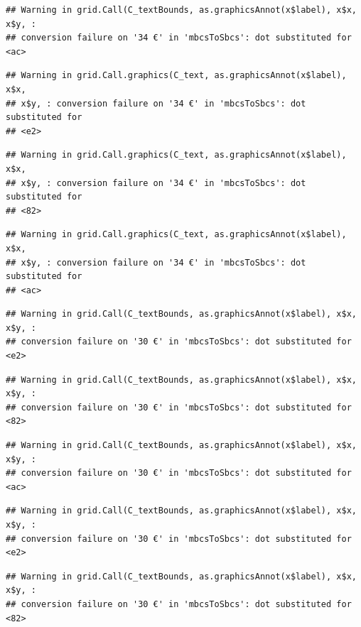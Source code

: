 \documentclass[]{gitbook}
\begin{document}
\begin{verbatim}
## Warning in grid.Call(C_textBounds, as.graphicsAnnot(x$label), x$x, x$y, :
## conversion failure on '34 €' in 'mbcsToSbcs': dot substituted for <ac>
\end{verbatim}

\begin{verbatim}
## Warning in grid.Call.graphics(C_text, as.graphicsAnnot(x$label), x$x,
## x$y, : conversion failure on '34 €' in 'mbcsToSbcs': dot substituted for
## <e2>
\end{verbatim}

\begin{verbatim}
## Warning in grid.Call.graphics(C_text, as.graphicsAnnot(x$label), x$x,
## x$y, : conversion failure on '34 €' in 'mbcsToSbcs': dot substituted for
## <82>
\end{verbatim}

\begin{verbatim}
## Warning in grid.Call.graphics(C_text, as.graphicsAnnot(x$label), x$x,
## x$y, : conversion failure on '34 €' in 'mbcsToSbcs': dot substituted for
## <ac>
\end{verbatim}

\begin{verbatim}
## Warning in grid.Call(C_textBounds, as.graphicsAnnot(x$label), x$x, x$y, :
## conversion failure on '30 €' in 'mbcsToSbcs': dot substituted for <e2>
\end{verbatim}

\begin{verbatim}
## Warning in grid.Call(C_textBounds, as.graphicsAnnot(x$label), x$x, x$y, :
## conversion failure on '30 €' in 'mbcsToSbcs': dot substituted for <82>
\end{verbatim}

\begin{verbatim}
## Warning in grid.Call(C_textBounds, as.graphicsAnnot(x$label), x$x, x$y, :
## conversion failure on '30 €' in 'mbcsToSbcs': dot substituted for <ac>
\end{verbatim}

\begin{verbatim}
## Warning in grid.Call(C_textBounds, as.graphicsAnnot(x$label), x$x, x$y, :
## conversion failure on '30 €' in 'mbcsToSbcs': dot substituted for <e2>
\end{verbatim}

\begin{verbatim}
## Warning in grid.Call(C_textBounds, as.graphicsAnnot(x$label), x$x, x$y, :
## conversion failure on '30 €' in 'mbcsToSbcs': dot substituted for <82>
\end{verbatim}
\end{document}
